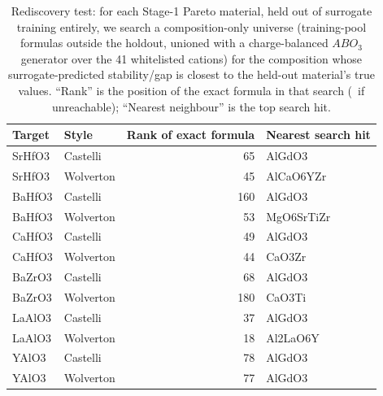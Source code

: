 \begin{table}[t]
\centering
\caption{Rediscovery test: for each Stage-1 Pareto material, held out of surrogate training entirely, we search a composition-only universe (training-pool formulas outside the holdout, unioned with a charge-balanced $ABO_3$ generator over the 41 whitelisted cations) for the composition whose surrogate-predicted stability/gap is closest to the held-out material's true values. ``Rank'' is the position of the exact formula in that search (\textemdash\ if unreachable); ``Nearest neighbour'' is the top search hit.}
\label{tab:a5_rediscovery}
\begin{tabular}{llrl}
\toprule
Target & Style & Rank of exact formula & Nearest search hit \\
\midrule
SrHfO3 & Castelli & 65 & AlGdO3 \\
SrHfO3 & Wolverton & 45 & AlCaO6YZr \\
BaHfO3 & Castelli & 160 & AlGdO3 \\
BaHfO3 & Wolverton & 53 & MgO6SrTiZr \\
CaHfO3 & Castelli & 49 & AlGdO3 \\
CaHfO3 & Wolverton & 44 & CaO3Zr \\
BaZrO3 & Castelli & 68 & AlGdO3 \\
BaZrO3 & Wolverton & 180 & CaO3Ti \\
LaAlO3 & Castelli & 37 & AlGdO3 \\
LaAlO3 & Wolverton & 18 & Al2LaO6Y \\
YAlO3 & Castelli & 78 & AlGdO3 \\
YAlO3 & Wolverton & 77 & AlGdO3 \\
\bottomrule
\end{tabular}
\end{table}
